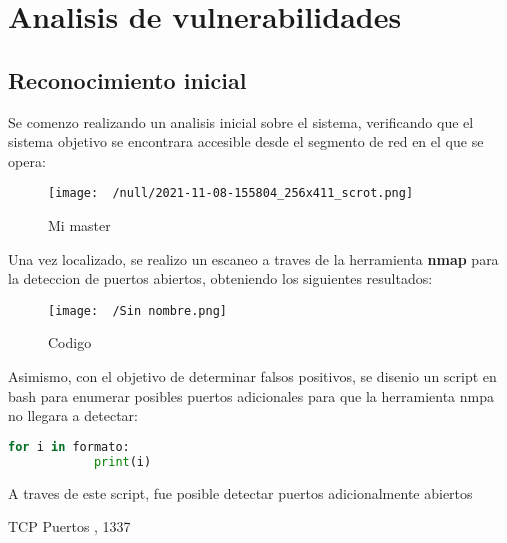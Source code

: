 \documentclass[a4paper]{article} %
\begin{document}
    \section{Analisis de vulnerabilidades}
    \subsection{Reconocimiento inicial}
    \vspace{0.2cm}
   Se comenzo realizando un analisis inicial sobre el sistema, verificando que el sistema objetivo se encontrara accesible desde el segmento de red en el que se opera: 
   \vspace{0.2cm}
   \begin{figure}[h]
      \begin{center}
          \texttt{[image: ~/null/2021-11-08-155804\_256x411\_scrot.png]}
      \end{center} 
       \caption{Mi master}
   \end{figure}
   \par
    \vspace{0.2cm}
    Una vez localizado, se realizo un escaneo a traves de la herramienta \textbf{nmap} para la deteccion de puertos abiertos, obteniendo los siguientes resultados:

    \begin{figure}[h]
       \begin{center}
           \texttt{[image: ~/Sin nombre.png]}
       \end{center} 
        \caption{Codigo}
    \end{figure}
    \clearpage
    Asimismo, con el objetivo de determinar falsos positivos, se disenio un script en bash para enumerar posibles puertos adicionales para que la herramienta nmpa no llegara a detectar:

    \vspace{0.2cm}

    \begin{lstlisting}[language=python, caption=Script personalizado para la enumeracion de puertos]
       for i in formato:
            print(i)
    \end{lstlisting}
    \vspace{0.3cm}
    A traves de este script, fue posible detectar puertos adicionalmente abiertos
    \begin{schema}{TCP}
       Puertos
        , 1337
    \end{schema}
\end{document}
